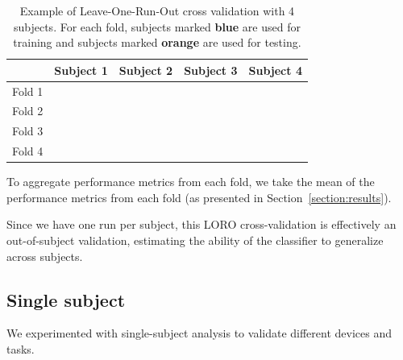         \begin{table}[h]
            \centering
            \begin{tabular}{lcccc}
                \toprule
                       & Subject 1 & Subject 2 & Subject 3 & Subject 4 \\
                \midrule
                Fold 1 & \cellcolor{test}     & \multicolumn{3}{c}{\cellcolor{train}} \\
                Fold 2 & \cellcolor{train} & \cellcolor{test}     & \multicolumn{2}{c}{\cellcolor{train}     } \\
                Fold 3 & \multicolumn{2}{c}{\cellcolor{train}     } & \cellcolor{test}     & \cellcolor{train} \\
                Fold 4 & \multicolumn{3}{c}{\cellcolor{train}} & \cellcolor{test}     \\
                \bottomrule
            \end{tabular}
            \caption{Example of Leave-One-Run-Out cross validation with 4 subjects. For each fold, subjects marked \textcolor{NavyBlue}{\textbf{blue}} are used for training and subjects marked \textcolor{BurntOrange}{\textbf{orange}} are used for testing.}\label{table:loro}
        \end{table}

        To aggregate performance metrics from each fold, we take the mean of the performance metrics from each fold (as presented in Section~\ref{section:results}).

        Since we have one run per subject, this LORO cross-validation is effectively an out-of-subject validation, estimating the ability of the classifier to generalize across subjects.

    \subsection{Single subject}

        We experimented with single-subject analysis to validate different devices and tasks.
